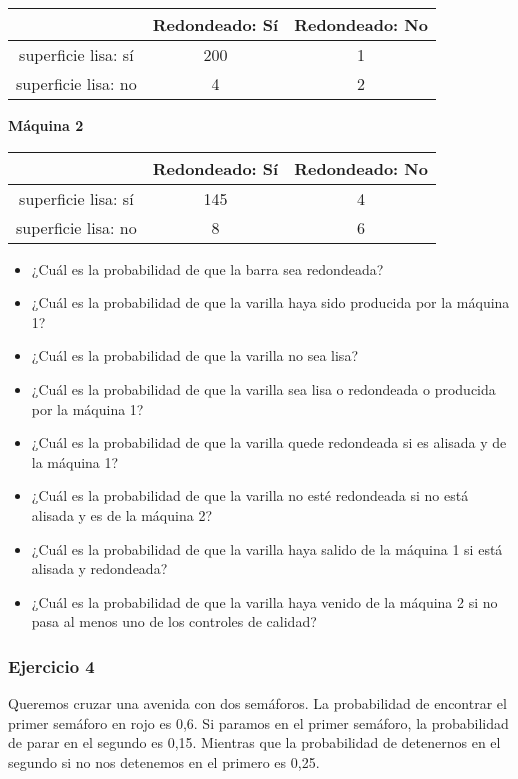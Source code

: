 \documentclass[
]{book}
\providecommand{\tightlist}{%
  \setlength{\itemsep}{0pt}\setlength{\parskip}{0pt}}
\begin{document}
\begin{longtable}[]{@{}ccc@{}}
\toprule
& Redondeado: Sí & Redondeado: No \\
\midrule
\endhead
superficie lisa: sí & 200 & 1 \\
superficie lisa: no & 4 & 2 \\
\bottomrule
\end{longtable}

\textbf{Máquina 2}

\begin{longtable}[]{@{}ccc@{}}
\toprule
& Redondeado: Sí & Redondeado: No \\
\midrule
\endhead
superficie lisa: sí & 145 & 4 \\
superficie lisa: no & 8 & 6 \\
\bottomrule
\end{longtable}

\begin{itemize}
\tightlist
\item
  ¿Cuál es la probabilidad de que la barra sea redondeada?
\item
  ¿Cuál es la probabilidad de que la varilla haya sido producida por la máquina 1?
\item
  ¿Cuál es la probabilidad de que la varilla no sea lisa?
\item
  ¿Cuál es la probabilidad de que la varilla sea lisa o redondeada o producida por la máquina 1?
\item
  ¿Cuál es la probabilidad de que la varilla quede redondeada si es alisada y de la máquina 1?
\item
  ¿Cuál es la probabilidad de que la varilla no esté redondeada si no está alisada y es de la máquina 2?
\item
  ¿Cuál es la probabilidad de que la varilla haya salido de la máquina 1 si está alisada y redondeada?
\item
  ¿Cuál es la probabilidad de que la varilla haya venido de la máquina 2 si no pasa al menos uno de los controles de calidad?
\end{itemize}

\hypertarget{ejercicio-4}{%
\subsubsection{Ejercicio 4}\label{ejercicio-4}}

Queremos cruzar una avenida con dos semáforos. La probabilidad de encontrar el primer semáforo en rojo es 0,6. Si paramos en el primer semáforo, la probabilidad de parar en el segundo es 0,15. Mientras que la probabilidad de detenernos en el segundo si no nos detenemos en el primero es 0,25.
\end{document}
